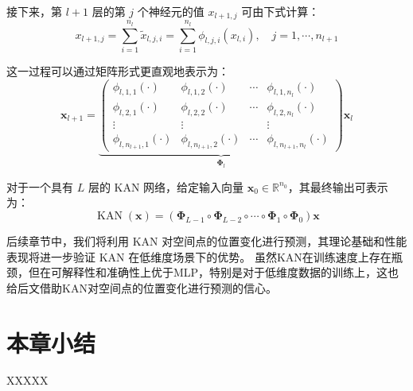 接下来，第 $l+1$ 层的第 $j$ 个神经元的值 $x_{l+1,j}$ 可由下式计算：
\begin{equation}
    x_{l+1, j}=\sum_{i=1}^{n_l} \tilde{x}_{l, j, i}=\sum_{i=1}^{n_l} \phi_{l, j, i}\left(x_{l, i}\right), \quad j=1, \cdots, n_{l+1}
\end{equation}

这一过程可以通过矩阵形式更直观地表示为：
\begin{equation}
    \mathbf{x}_{l+1}=\underbrace{\left(\begin{array}{cccc}\phi_{l, 1,1}(\cdot) & \phi_{l, 1,2}(\cdot) & \cdots & \phi_{l, 1, n_l}(\cdot) \\ \phi_{l, 2,1}(\cdot) & \phi_{l, 2,2}(\cdot) & \cdots & \phi_{l, 2, n_l}(\cdot) \\ \vdots & \vdots & & \vdots \\ \phi_{l, n_{l+1}, 1}(\cdot) & \phi_{l, n_{l+1}, 2}(\cdot) & \cdots & \phi_{l, n_{l+1}, n_l}(\cdot)\end{array}\right)}_{\boldsymbol{\Phi}_l} \mathbf{x}_l
\end{equation}

对于一个具有 $L$ 层的 KAN 网络，给定输入向量 $\mathbf{x}_0 \in \mathbb{R}^{n_0}$，其最终输出可表示为：
\begin{equation}
    \operatorname{KAN}(\mathbf{x})=\left(\boldsymbol{\Phi}_{L-1} \circ \boldsymbol{\Phi}_{L-2} \circ \cdots \circ \boldsymbol{\Phi}_1 \circ \boldsymbol{\Phi}_0\right) \mathbf{x}
\end{equation}

后续章节中，我们将利用 KAN 对空间点的位置变化进行预测，其理论基础和性能表现将进一步验证 KAN 在低维度场景下的优势。
虽然KAN在训练速度上存在瓶颈，但在可解释性和准确性上优于MLP，特别是对于低维度数据的训练上，这也给后文借助KAN对空间点的位置变化进行预测的信心。

\section{本章小结}
XXXXX